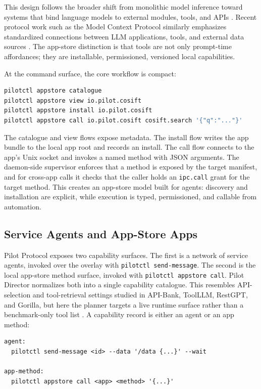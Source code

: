\documentclass[10pt,twocolumn]{article}
\newcommand{\pilot}{Pilot Protocol}
\newcommand{\director}{Pilot Director}
\begin{document}
This design follows the broader shift from monolithic model inference toward systems that bind language models to external modules, tools, and APIs \cite{karpas2022mrkl,schick2023toolformer,patil2024gorilla}. Recent protocol work such as the Model Context Protocol similarly emphasizes standardized connections between LLM applications, tools, and external data sources \cite{mcp2025spec}. The app-store distinction is that tools are not only prompt-time affordances; they are installable, permissioned, versioned local capabilities.

At the command surface, the core workflow is compact:

\begin{lstlisting}[language=bash]
pilotctl appstore catalogue
pilotctl appstore view io.pilot.cosift
pilotctl appstore install io.pilot.cosift
pilotctl appstore call io.pilot.cosift cosift.search '{"q":"..."}'
\end{lstlisting}

The catalogue and view flows expose metadata. The install flow writes the app bundle to the local app root and records an install. The call flow connects to the app's Unix socket and invokes a named method with JSON arguments. The daemon-side supervisor enforces that a method is exposed by the target manifest, and for cross-app calls it checks that the caller holds an \texttt{ipc.call} grant for the target method. This creates an app-store model built for agents: discovery and installation are explicit, while execution is typed, permissioned, and callable from automation.

\subsection{Service Agents and App-Store Apps}

\pilot{} exposes two capability surfaces. The first is a network of service agents, invoked over the overlay with \texttt{pilotctl send-message}. The second is the local app-store method surface, invoked with \texttt{pilotctl appstore call}. \director{} normalizes both into a single capability catalogue. This resembles API-selection and tool-retrieval settings studied in API-Bank, ToolLLM, RestGPT, and Gorilla, but here the planner targets a live runtime surface rather than a benchmark-only tool list \cite{li2023apibank,qin2023toollm,song2023restgpt,patil2024gorilla}. A capability record is either an agent or an app method:

\begin{lstlisting}
agent:
  pilotctl send-message <id> --data '/data {...}' --wait

app-method:
  pilotctl appstore call <app> <method> '{...}'
\end{lstlisting}
\end{document}
